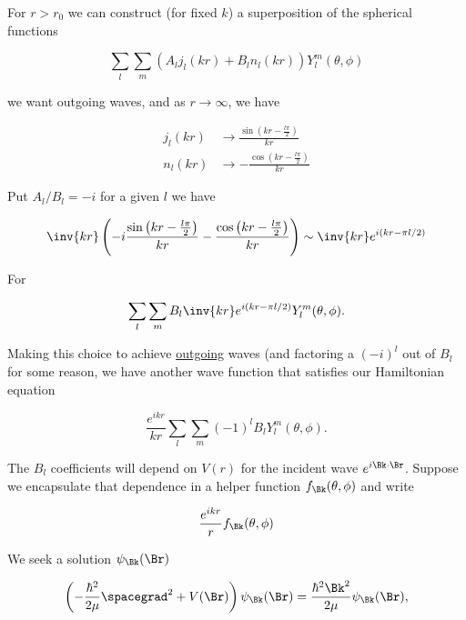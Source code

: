 For $r > r_0$ we can construct (for fixed $k$) a superposition of the spherical functions

\begin{equation}\label{eqn:qmTwoL23:480}
\sum_l \sum_m \left( A_l j_l( k r ) + B_l n_l(k r) \right) Y_l^m(\theta, \phi)
\end{equation}

we want outgoing waves, and as $r \rightarrow \infty$, we have

\begin{align}\label{eqn:qmTwoL23:500}
j_l(k r) &\rightarrow \frac{\sin\left(kr - \frac{l \pi}{2}\right)}{k r} \\
n_l(k r) &\rightarrow -\frac{\cos\left(kr - \frac{l \pi}{2}\right)}{k r}
\end{align}

Put $A_l/B_l = -i$ for a given $l$ we have

\begin{equation}\label{eqn:qmTwoL23:520}
\inv{k r} \left( -i
\frac{\sin\left(kr - \frac{l \pi}{2}\right)}{k r}
-\frac{\cos\left(kr - \frac{l \pi}{2}\right)}{k r} \right)
\sim \inv{k r} e^{i (k r - \pi l/2)}
\end{equation}

For

\begin{equation}\label{eqn:qmTwoL23:540}
\sum_l
\sum_m B_l
\inv{k r} e^{i (k r - \pi l/2)} Y_l^m(\theta, \phi).
\end{equation}

Making this choice to achieve \underline{outgoing} waves (and factoring a $(-i)^l$ out of $B_l$ for some reason, we have another wave function that satisfies our Hamiltonian equation

\begin{equation}\label{eqn:qmTwoL23:560}
\frac{e^{i k r}}{k r}
\sum_l
\sum_m
(-1)^l
B_l
Y_l^m(\theta, \phi).
\end{equation}

The $B_l$ coefficients will depend on $V(r)$ for the incident wave $e^{i \Bk \cdot \Br}$.  Suppose we encapsulate that dependence in a helper function $f_\Bk(\theta, \phi)$ and write

\begin{equation}\label{eqn:qmTwoL23:580}
\frac{e^{i k r}}{r} f_\Bk(\theta, \phi)
\end{equation}

We seek a solution $\psi_\Bk(\Br)$

\begin{equation}\label{eqn:qmTwoL23:60b}
\left( - \frac{\hbar^2}{2\mu} \spacegrad^2
+ V(\Br)
\right)
\psi_\Bk(\Br)
 = \frac{\hbar^2 \Bk^2}{2 \mu}
\psi_\Bk(\Br),
\end{equation}

